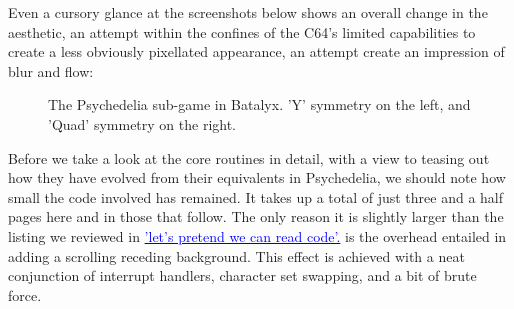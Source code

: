 Even a cursory glance at the screenshots below shows an overall change in the aesthetic, an attempt within the confines of the C64's limited capabilities to create
a less obviously pixellated appearance, an attempt create an impression of blur and flow:

\begin{figure}[H]
    \begin{adjustbox}{width=13cm,center}
      \hspace{0.2cm}
    \end{adjustbox}
\caption{The Psychedelia sub-game in Batalyx. 'Y' symmetry on the left, and 'Quad' symmetry on the right.}
\end{figure}

Before we take a look at the core routines in detail, with a view to teasing out how they have evolved from their equivalents in Psychedelia, we should note how small
the code involved has remained. It takes up a total of just three and a half pages here and in those that follow. The only reason it is slightly larger than the
listing we reviewed in \hyperref[sec:listing_commentary]{\textcolor{blue}{'let's pretend we can read code'.}} is the overhead entailed in adding a scrolling receding
background. This effect is achieved with a neat conjunction of interrupt handlers, character set swapping, and a bit of brute force.

